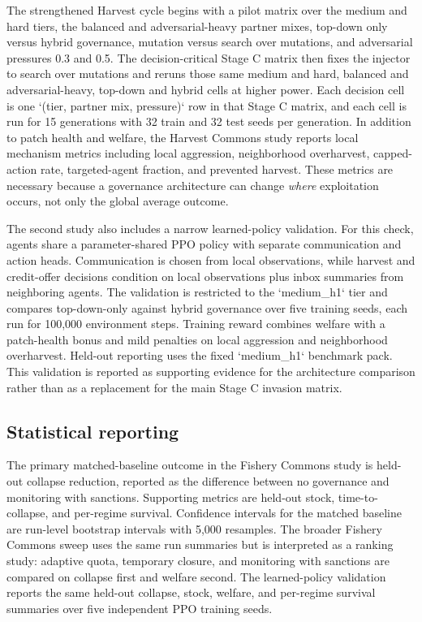 The strengthened Harvest cycle begins with a pilot matrix over the medium and hard tiers, the balanced and adversarial-heavy partner mixes, top-down only versus hybrid governance, mutation versus search over mutations, and adversarial pressures 0.3 and 0.5. The decision-critical Stage C matrix then fixes the injector to search over mutations and reruns those same medium and hard, balanced and adversarial-heavy, top-down and hybrid cells at higher power. Each decision cell is one `(tier, partner mix, pressure)` row in that Stage C matrix, and each cell is run for 15 generations with 32 train and 32 test seeds per generation. In addition to patch health and welfare, the Harvest Commons study reports local mechanism metrics including local aggression, neighborhood overharvest, capped-action rate, targeted-agent fraction, and prevented harvest. These metrics are necessary because a governance architecture can change \emph{where} exploitation occurs, not only the global average outcome.

The second study also includes a narrow learned-policy validation. For this check, agents share a parameter-shared PPO policy with separate communication and action heads. Communication is chosen from local observations, while harvest and credit-offer decisions condition on local observations plus inbox summaries from neighboring agents. The validation is restricted to the `medium\_h1` tier and compares top-down-only against hybrid governance over five training seeds, each run for 100{,}000 environment steps. Training reward combines welfare with a patch-health bonus and mild penalties on local aggression and neighborhood overharvest. Held-out reporting uses the fixed `medium\_h1` benchmark pack. This validation is reported as supporting evidence for the architecture comparison rather than as a replacement for the main Stage C invasion matrix.

\subsection{Statistical reporting}

The primary matched-baseline outcome in the Fishery Commons study is held-out collapse reduction, reported as the difference between no governance and monitoring with sanctions. Supporting metrics are held-out stock, time-to-collapse, and per-regime survival. Confidence intervals for the matched baseline are run-level bootstrap intervals with 5{,}000 resamples. The broader Fishery Commons sweep uses the same run summaries but is interpreted as a ranking study: adaptive quota, temporary closure, and monitoring with sanctions are compared on collapse first and welfare second. The learned-policy validation reports the same held-out collapse, stock, welfare, and per-regime survival summaries over five independent PPO training seeds.

